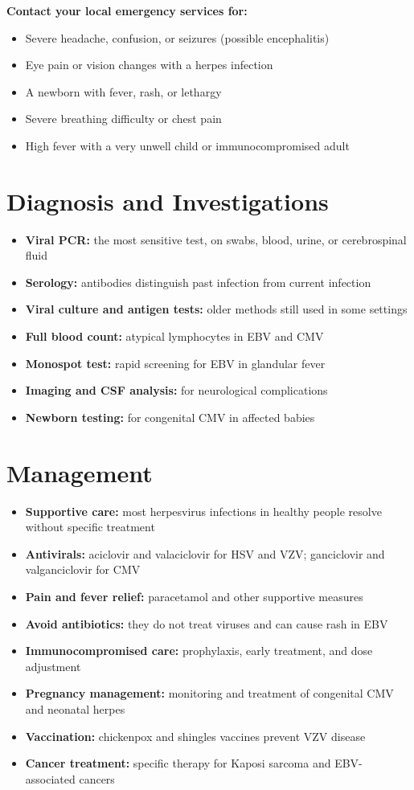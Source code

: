 \textbf{Contact your local emergency services for:}
\begin{itemize}
    \item Severe headache, confusion, or seizures (possible encephalitis)
    \item Eye pain or vision changes with a herpes infection
    \item A newborn with fever, rash, or lethargy
    \item Severe breathing difficulty or chest pain
    \item High fever with a very unwell child or immunocompromised adult
\end{itemize}

\section*{Diagnosis and Investigations}
\begin{itemize}
    \item \textbf{Viral PCR:} the most sensitive test, on swabs, blood, urine, or cerebrospinal fluid
    \item \textbf{Serology:} antibodies distinguish past infection from current infection
    \item \textbf{Viral culture and antigen tests:} older methods still used in some settings
    \item \textbf{Full blood count:} atypical lymphocytes in EBV and CMV
    \item \textbf{Monospot test:} rapid screening for EBV in glandular fever
    \item \textbf{Imaging and CSF analysis:} for neurological complications
    \item \textbf{Newborn testing:} for congenital CMV in affected babies
\end{itemize}

\section*{Management}
\begin{itemize}
    \item \textbf{Supportive care:} most herpesvirus infections in healthy people resolve without specific treatment
    \item \textbf{Antivirals:} aciclovir and valaciclovir for HSV and VZV; ganciclovir and valganciclovir for CMV
    \item \textbf{Pain and fever relief:} paracetamol and other supportive measures
    \item \textbf{Avoid antibiotics:} they do not treat viruses and can cause rash in EBV
    \item \textbf{Immunocompromised care:} prophylaxis, early treatment, and dose adjustment
    \item \textbf{Pregnancy management:} monitoring and treatment of congenital CMV and neonatal herpes
    \item \textbf{Vaccination:} chickenpox and shingles vaccines prevent VZV disease
    \item \textbf{Cancer treatment:} specific therapy for Kaposi sarcoma and EBV-associated cancers
\end{itemize}

